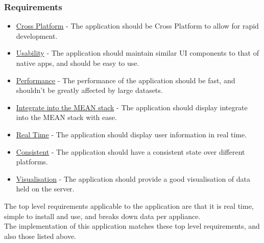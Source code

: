 \documentclass[draft,preprint,12pt,3p]{elsarticle}
\begin{document}
\subsubsection{Requirements}
\begin{itemize}
\item \underline{Cross Platform} - The application should be Cross Platform to allow for rapid development.
\item \underline{Usability} - The application should maintain similar UI components to that of native apps, and should be easy to use.
\item \underline{Performance} - The performance of the application should be fast, and shouldn't be greatly affected by large datasets.
\item \underline{Integrate into the MEAN stack} - The application should display integrate into the MEAN stack with ease.
\item \underline{Real Time} - The application should display user information in real time.
\item \underline{Consistent} - The application should have a consistent state over different platforms.
\item \underline{Visualisation} - The application should provide a good visualisation of data held on the server.
\end{itemize}
The top level requirements applicable to the application are that it is real time, simple to install and use, and breaks down data per appliance.\\
The implementation of this application matches these top level requirements, and also those listed above.
\end{document}

